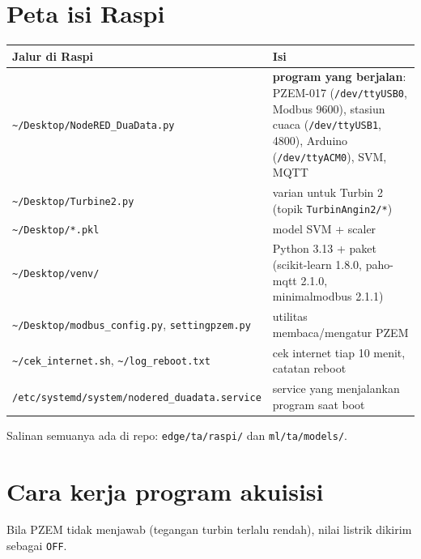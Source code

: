 \documentclass[10.5pt,a4paper]{article}
\newcommand{\cmd}[1]{\texttt{#1}}
\begin{document}
\section{Peta isi Raspi}
\begin{center}
\small
\begin{tabularx}{\linewidth}{@{}l X@{}}
\toprule
Jalur di Raspi & Isi \\
\midrule
\cmd{\textasciitilde/Desktop/NodeRED\_DuaData.py} & \textbf{program yang berjalan}: PZEM-017 (\cmd{/dev/ttyUSB0}, Modbus 9600), stasiun cuaca (\cmd{/dev/ttyUSB1}, 4800), Arduino (\cmd{/dev/ttyACM0}), SVM, MQTT \\
\cmd{\textasciitilde/Desktop/Turbine2.py} & varian untuk Turbin 2 (topik \cmd{TurbinAngin2/*}) \\
\cmd{\textasciitilde/Desktop/*.pkl} & model SVM + scaler \\
\cmd{\textasciitilde/Desktop/venv/} & Python 3.13 + paket (scikit-learn 1.8.0, paho-mqtt 2.1.0, minimalmodbus 2.1.1) \\
\cmd{\textasciitilde/Desktop/modbus\_config.py}, \cmd{settingpzem.py} & utilitas membaca/mengatur PZEM \\
\cmd{\textasciitilde/cek\_internet.sh}, \cmd{\textasciitilde/log\_reboot.txt} & cek internet tiap 10 menit, catatan reboot \\
\cmd{/etc/systemd/system/nodered\_duadata.service} & service yang menjalankan program saat boot \\
\bottomrule
\end{tabularx}
\end{center}
Salinan semuanya ada di repo: \cmd{edge/ta/raspi/} dan \cmd{ml/ta/models/}.

\section{Cara kerja program akuisisi}
\begin{center}
\end{center}
Bila PZEM tidak menjawab (tegangan turbin terlalu rendah), nilai listrik dikirim sebagai \cmd{OFF}.
\end{document}
